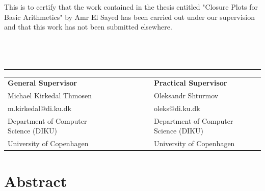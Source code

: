 \documentclass[11pt]{article}
\begin{document}
This is to certify that the work contained in the thesis entitled "Closure Plots for Basic Arithmetics" by Amr El Sayed has been carried out under our supervision and that this work has not been submitted elsewhere.\\\\\\\\
\begin{center}\noindent\rule{8cm}{0.4pt}%

\begin{tabular}{ l l l c r l l l}\\
    \textbf{General Supervisor} & & & & & & \textbf{Practical Supervisor} \\
    Michael Kirkedal Thmosen & & & & & & Oleksandr Shturmov\\
    m.kirkedal@di.ku.dk & & & & & & oleks@di.ku.dk\\
    Department of Computer Science (DIKU) & & & & & & Department of Computer Science (DIKU)\\
    University of Copenhagen & & & & & & University of Copenhagen\\
\end{tabular}
\end{center}
\newpage
\section{Abstract}
\end{document}
